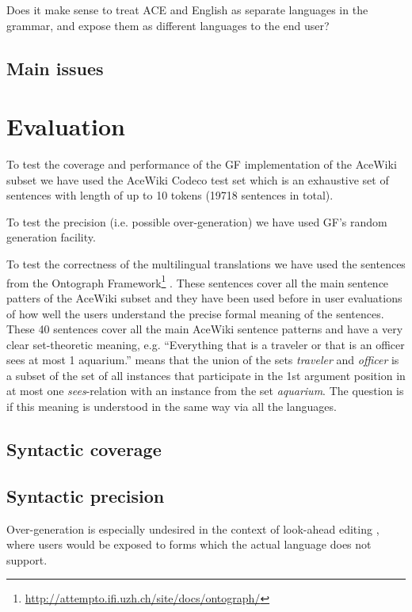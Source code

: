 \documentclass[a4paper]{article}
\begin{document}
Does it make sense to treat ACE and English as separate languages in the
grammar, and expose them as different languages to the end user?

\subsection{Main issues}

\section{Evaluation}

To test the coverage and performance of the GF implementation of the
AceWiki subset we have used
the AceWiki Codeco test set which
is an exhaustive set of sentences with length of up to 10 tokens
(19718 sentences in total).

To test the precision (i.e. possible over-generation) we have used GF's
random generation facility.

To test the correctness of the multilingual translations we have used
the sentences from the
Ontograph
Framework\footnote{\url{http://attempto.ifi.uzh.ch/site/docs/ontograph/}}
\cite{kuhn2009cnlmain}. These sentences cover all the main sentence
patters of the AceWiki subset and they have been used before in user
evaluations of how well the users understand the precise formal meaning
of the sentences.
These 40 sentences cover all the main AceWiki sentence patterns and have
a very clear set-theoretic meaning, e.g.
``Everything that is a traveler or that is an officer sees
at most 1 aquarium.'' means that the union of the sets \emph{traveler} and
\emph{officer} is a subset of the set of all instances that participate in
the 1st argument position in at most one \emph{sees}-relation with an
instance from the set \emph{aquarium}.
The question is if this meaning is understood in the same way via all the
languages.

\subsection{Syntactic coverage}


\subsection{Syntactic precision}

Over-generation is especially undesired in the context of look-ahead editing
\cite{schwitter:eamt-claw2003}, where users would be exposed to
forms which the actual language does not support.
\end{document}
